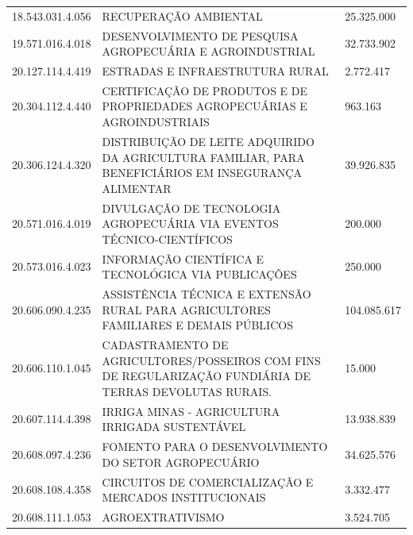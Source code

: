 \documentclass{article}
\begin{document}
\begin{longtable}[c]{m{3cm}|m{12cm}|m{2cm}}
\multicolumn{1}{C{3cm}|}{18.543.031.4.056} & \multicolumn{1}{L{12cm}|}{RECUPERAÇÃO AMBIENTAL} & \multicolumn{1}{R{2cm}}{25.325.000} \\
\multicolumn{1}{C{3cm}|}{19.571.016.4.018} & \multicolumn{1}{L{12cm}|}{DESENVOLVIMENTO DE PESQUISA AGROPECUÁRIA E AGROINDUSTRIAL} & \multicolumn{1}{R{2cm}}{32.733.902} \\
\multicolumn{1}{C{3cm}|}{20.127.114.4.419} & \multicolumn{1}{L{12cm}|}{ESTRADAS E INFRAESTRUTURA RURAL} & \multicolumn{1}{R{2cm}}{2.772.417} \\
\multicolumn{1}{C{3cm}|}{20.304.112.4.440} & \multicolumn{1}{L{12cm}|}{CERTIFICAÇÃO DE PRODUTOS E DE PROPRIEDADES AGROPECUÁRIAS E AGROINDUSTRIAIS} & \multicolumn{1}{R{2cm}}{963.163} \\
\multicolumn{1}{C{3cm}|}{20.306.124.4.320} & \multicolumn{1}{L{12cm}|}{DISTRIBUIÇÃO DE LEITE ADQUIRIDO DA AGRICULTURA FAMILIAR, PARA BENEFICIÁRIOS EM INSEGURANÇA ALIMENTAR} & \multicolumn{1}{R{2cm}}{39.926.835} \\
\multicolumn{1}{C{3cm}|}{20.571.016.4.019} & \multicolumn{1}{L{12cm}|}{DIVULGAÇÃO DE TECNOLOGIA AGROPECUÁRIA VIA EVENTOS TÉCNICO-CIENTÍFICOS} & \multicolumn{1}{R{2cm}}{200.000} \\
\multicolumn{1}{C{3cm}|}{20.573.016.4.023} & \multicolumn{1}{L{12cm}|}{INFORMAÇÃO CIENTÍFICA E TECNOLÓGICA VIA PUBLICAÇÕES} & \multicolumn{1}{R{2cm}}{250.000} \\
\multicolumn{1}{C{3cm}|}{20.606.090.4.235} & \multicolumn{1}{L{12cm}|}{ASSISTÊNCIA TÉCNICA E EXTENSÃO RURAL PARA AGRICULTORES FAMILIARES E DEMAIS PÚBLICOS} & \multicolumn{1}{R{2cm}}{104.085.617} \\
\multicolumn{1}{C{3cm}|}{20.606.110.1.045} & \multicolumn{1}{L{12cm}|}{CADASTRAMENTO DE AGRICULTORES/POSSEIROS COM FINS DE REGULARIZAÇÃO FUNDIÁRIA DE TERRAS DEVOLUTAS RURAIS.} & \multicolumn{1}{R{2cm}}{15.000} \\
\multicolumn{1}{C{3cm}|}{20.607.114.4.398} & \multicolumn{1}{L{12cm}|}{IRRIGA MINAS - AGRICULTURA IRRIGADA SUSTENTÁVEL} & \multicolumn{1}{R{2cm}}{13.938.839} \\
\multicolumn{1}{C{3cm}|}{20.608.097.4.236} & \multicolumn{1}{L{12cm}|}{FOMENTO PARA O DESENVOLVIMENTO DO SETOR AGROPECUÁRIO} & \multicolumn{1}{R{2cm}}{34.625.576} \\
\multicolumn{1}{C{3cm}|}{20.608.108.4.358} & \multicolumn{1}{L{12cm}|}{CIRCUITOS DE COMERCIALIZAÇÃO E MERCADOS INSTITUCIONAIS} & \multicolumn{1}{R{2cm}}{3.332.477} \\
\multicolumn{1}{C{3cm}|}{20.608.111.1.053} & \multicolumn{1}{L{12cm}|}{AGROEXTRATIVISMO} & \multicolumn{1}{R{2cm}}{3.524.705} \\

\end{longtable}
\end{document}
